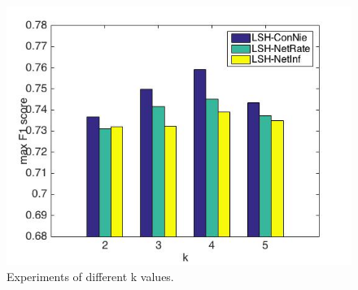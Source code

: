 \begin{figure}[H]
\centerline{
\includegraphics[width=0.75\linewidth]{figures/SettingK.jpg}}
\caption{Experiments of different k values. }\label{fig:SetK}
\end{figure}
